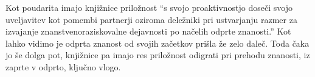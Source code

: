 \documentclass[a4paper,12pt]{article}
\begin{document}
Kot poudarita \textcite[str. 26]{Pusnik} imajo knjižnice priložnost "`s svojo proaktivnostjo doseči svojo uveljavitev kot pomembi partnerji oziroma deležniki pri ustvarjanju razmer za izvajanje znanstvenoraziskovalne dejavnosti po načelih odprte znanosti."' Kot lahko vidimo je odprta znanost od svojih začetkov prišla že zelo daleč. Toda čaka jo še dolga pot, knjižnice pa imajo res priložnost odigrati pri prehodu znanosti, iz zaprte v odprto, ključno vlogo.

\newpage
\printbibliography[
    heading=bibintoc,
    title={\refname\label{sec:Literatura}}
]
\end{document}
